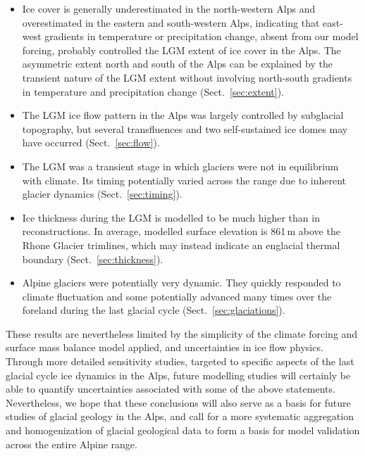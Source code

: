 \documentclass[tc, manuscript]{copernicus}
\begin{document}
    \begin{itemize}
      \item Ice cover is generally underestimated in the north-western Alps and
            overestimated in the eastern and south-western Alps, indicating
            that east-west
            gradients in temperature or precipitation change, absent from our
            model forcing, probably controlled the LGM extent of ice cover in
            the Alps. The asymmetric extent north and south of the Alps
            can be explained by the transient nature of the LGM extent without
            involving north-south gradients in temperature and precipitation
            change (Sect.~\ref{sec:extent}).
      \item The LGM ice flow pattern in the Alps was largely controlled by
            subglacial topography, but several transfluences and two
            self-sustained ice domes may have occurred (Sect.~\ref{sec:flow}).
      \item The LGM was a transient stage in which glaciers were not in
            equilibrium with climate. Its timing potentially varied across the
            range due to inherent glacier dynamics (Sect.~\ref{sec:timing}).
      \item Ice thickness during the LGM is modelled to be much higher than in
            reconstructions. In average, modelled surface elevation is 861\,m
            above the Rhone Glacier trimlines, which may instead indicate an
            englacial thermal boundary (Sect.~\ref{sec:thickness}).
      \item Alpine glaciers were potentially very dynamic. They quickly
            responded to climate fluctuation and some potentially advanced many
            times over the foreland during the last glacial cycle
            (Sect.~\ref{sec:glaciations}).
    \end{itemize}

    These results are nevertheless limited by the simplicity of the climate
    forcing and surface mass balance model applied, and uncertainties in ice
    flow physics. Through more detailed sensitivity studies, targeted to
    specific aspects of the last glacial cycle ice dynamics in the Alps, future
    modelling studies will certainly be able to quantify uncertainties
    associated with some of the above statements. Nevertheless, we hope that
    these conclusions will also serve as a basis for future studies of glacial
    geology in the Alps, and call for a more systematic aggregation and
    homogenization of glacial geological data to form a basis for model
    validation across the entire Alpine range.
\end{document}
